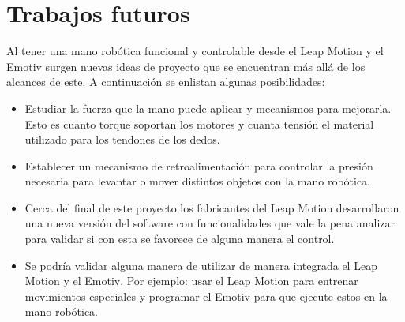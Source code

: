 \documentclass[letterpaper,journal,transmag]{IEEEtran}
\begin{document}
\section{Trabajos futuros}
Al tener una mano robótica funcional y controlable desde el Leap Motion y el
Emotiv surgen nuevas ideas de proyecto que se encuentran más allá de los
alcances de este. A continuación se enlistan algunas posibilidades:
\begin{itemize}
 \item Estudiar la fuerza que la mano puede aplicar y mecanismos para
mejorarla. Esto es cuanto torque soportan los motores y cuanta tensión el
material utilizado para los tendones de los dedos.
\item Establecer un mecanismo de retroalimentación para controlar la presión
necesaria para levantar o mover distintos objetos con la mano robótica.
\item Cerca del final de este proyecto los fabricantes del Leap Motion
desarrollaron una nueva versión del software con funcionalidades que vale la
pena analizar para validar si con esta se favorece de alguna manera el control.
\item Se podría validar alguna manera de utilizar de manera integrada el Leap
Motion y el Emotiv. Por ejemplo: usar el Leap Motion para entrenar movimientos
especiales y programar el Emotiv para que ejecute estos en la mano robótica.
\end{itemize}



\ifCLASSOPTIONcaptionsoff
\newpage
\fi










\end{document}
